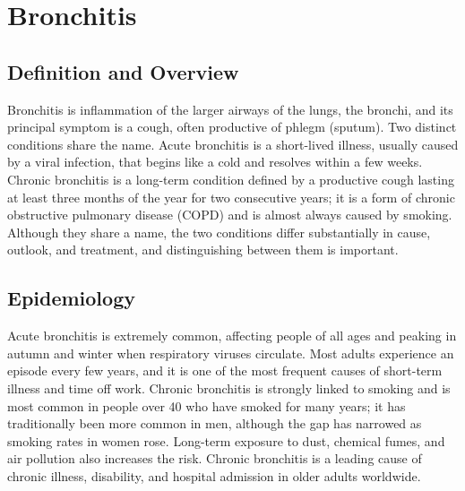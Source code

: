 \chapter{Bronchitis}

\section*{Definition and Overview}
Bronchitis is inflammation of the larger airways of the lungs, the bronchi, and its principal symptom is a cough, often productive of phlegm (sputum). Two distinct conditions share the name. Acute bronchitis is a short-lived illness, usually caused by a viral infection, that begins like a cold and resolves within a few weeks. Chronic bronchitis is a long-term condition defined by a productive cough lasting at least three months of the year for two consecutive years; it is a form of chronic obstructive pulmonary disease (COPD) and is almost always caused by smoking. Although they share a name, the two conditions differ substantially in cause, outlook, and treatment, and distinguishing between them is important.

\section*{Epidemiology}
Acute bronchitis is extremely common, affecting people of all ages and peaking in autumn and winter when respiratory viruses circulate. Most adults experience an episode every few years, and it is one of the most frequent causes of short-term illness and time off work. Chronic bronchitis is strongly linked to smoking and is most common in people over 40 who have smoked for many years; it has traditionally been more common in men, although the gap has narrowed as smoking rates in women rose. Long-term exposure to dust, chemical fumes, and air pollution also increases the risk. Chronic bronchitis is a leading cause of chronic illness, disability, and hospital admission in older adults worldwide.


